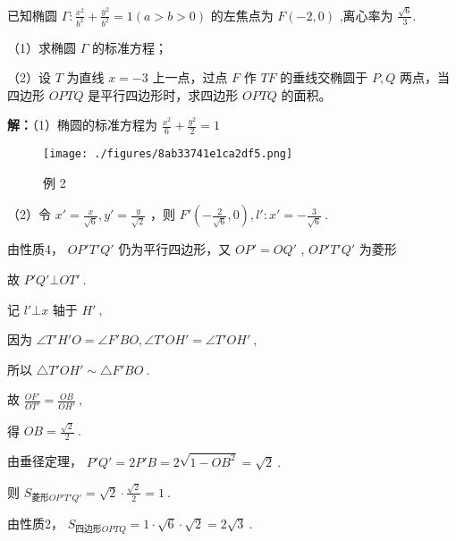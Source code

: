 \begin{example}{}
已知椭圆 $\displaystyle{\Gamma:\frac{x^2}{b^2}+\frac{y^2}{b^2}=1(a>b>0)}$ 的左焦点为 $\displaystyle{F(-2,0)}$ ,离心率为 $\displaystyle{\frac{\sqrt{6}}{3}}$.

（1）求椭圆 $\displaystyle{\Gamma}$ 的标准方程；

（2）设 $\displaystyle{T}$ 为直线 $\displaystyle{x=-3}$ 上一点，过点 $\displaystyle{F}$ 作 $\displaystyle{TF}$ 的垂线交椭圆于 $\displaystyle{P,Q}$ 两点，当四边形 $\displaystyle{OPTQ}$ 是平行四边形时，求四边形 $\displaystyle{OPTQ}$ 的面积。

\textbf{解：}（1）椭圆的标准方程为 $\displaystyle{\frac{x^2}{6}+\frac{y^2}{2}=1}$
\begin{figure}[ht]
\centering
\texttt{[image: ./figures/8ab33741e1ca2df5.png]}
\caption{例 2} \label{fig_affine_14}
\end{figure}
（2）令 $\displaystyle{x'=\frac{x}{\sqrt{6}},y'=\frac{y}{\sqrt{2}}}$ ，则 $\displaystyle{F'\left(-\frac{2}{\sqrt{6}},0\right) , l':x'=-\frac{3}{\sqrt{6}}}~.$

由性质4， $\displaystyle{OP'T'Q'}$ 仍为平行四边形，又 $\displaystyle{OP'=OQ'}$ , $\displaystyle{OP'T'Q'}$ 为菱形

故 $\displaystyle{P'Q'\bot OT'}~.$

记  $\displaystyle{l'\bot x}$ 轴于 $\displaystyle{H'}~,$ 

因为 $\displaystyle{\angle {T'H'O}=\angle {F'BO},\angle T'OH'=\angle T'OH'}~,$

所以 $\displaystyle{\triangle T'OH'\sim\triangle F'BO}~.$

故 $\displaystyle{\frac{OF'}{OT'}=\frac{OB}{OH'}}~,$

得 $\displaystyle{OB=\frac{\sqrt{2}}{2}}~.$

由垂径定理， $\displaystyle{P'Q'=2P'B=2\sqrt{1-OB^2}=\sqrt{2}}~.$

则 $\displaystyle{S_{\text{菱形}OP'T'Q'}=\sqrt{2}\cdot\frac{\sqrt{2}}{2}=1}~.$

由性质2， $\displaystyle{S_{\text{四边形}OPTQ}=1\cdot \sqrt{6}\cdot\sqrt{2}=2\sqrt{3}}~.$ 
\end{example}


